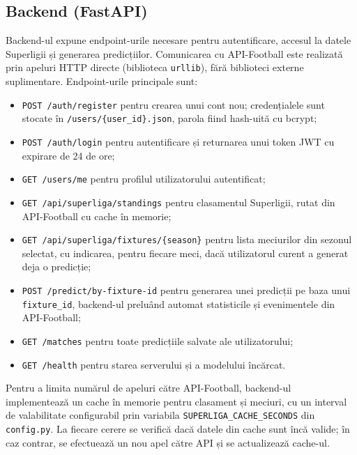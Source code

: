 \subsection{Backend (FastAPI)}

Backend-ul expune endpoint-urile necesare pentru autentificare, accesul la
datele Superligii și generarea predicțiilor. Comunicarea cu API-Football
este realizată prin apeluri HTTP directe (biblioteca \texttt{urllib}), fără
biblioteci externe suplimentare. Endpoint-urile principale sunt:

\begin{itemize}
    \item \texttt{POST /auth/register} pentru crearea unui cont nou;
    credențialele sunt stocate în \texttt{/users/\{user\_id\}.json}, parola
    fiind hash-uită cu bcrypt;
    \item \texttt{POST /auth/login} pentru autentificare și returnarea unui
    token JWT cu expirare de 24 de ore;
    \item \texttt{GET /users/me} pentru profilul utilizatorului autentificat;
    \item \texttt{GET /api/superliga/standings} pentru clasamentul
    Superligii, rutat din API-Football cu cache în memorie;
    \item \texttt{GET /api/superliga/fixtures/\{season\}} pentru lista
    meciurilor din sezonul selectat, cu indicarea, pentru fiecare meci, dacă
    utilizatorul curent a generat deja o predicție;
    \item \texttt{POST /predict/by-fixture-id} pentru generarea unei
    predicții pe baza unui \texttt{fixture\_id}, backend-ul preluând automat
    statisticile și evenimentele din API-Football;
    \item \texttt{GET /matches} pentru toate predicțiile salvate ale
    utilizatorului;
    \item \texttt{GET /health} pentru starea serverului și a modelului
    încărcat.
\end{itemize}

Pentru a limita numărul de apeluri către API-Football, backend-ul
implementează un cache în memorie pentru clasament și meciuri, cu un interval
de valabilitate configurabil prin variabila \texttt{SUPERLIGA\_CACHE\_SECONDS}
din \texttt{config.py}. La fiecare cerere se verifică dacă datele din cache
sunt încă valide; în caz contrar, se efectuează un nou apel către API și se
actualizează cache-ul.

